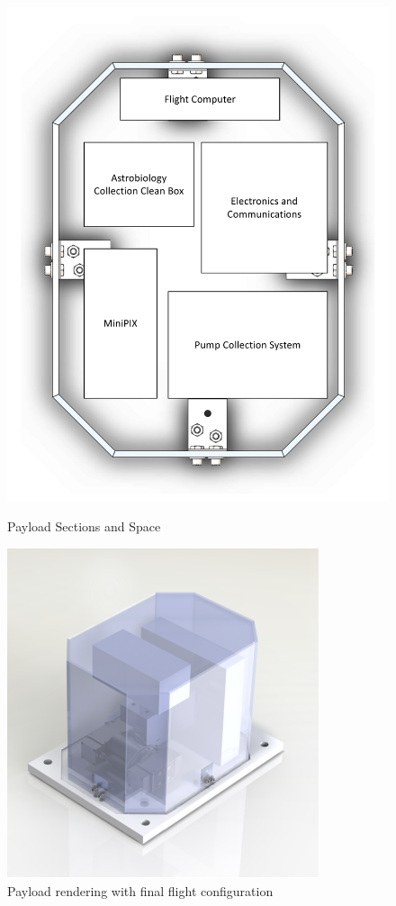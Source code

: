 \begin{figure}[H]
    \centering
    \begin{minipage}{0.45\textwidth}
        \centering
        \includegraphics[width=60 mm, scale=1]{figures/payload_sections.pdf} %
        \caption{Payload Sections and Space}
        	\label{fig:payload_sec}
    \end{minipage}\hfill
    \begin{minipage}{0.45\textwidth}
        \centering
        \includegraphics[width=78 mm, scale=1]{figures/Final_Render.pdf} %
        \caption{Payload rendering with final flight configuration}
        	\label{fig:final_render}
    \end{minipage}
\end{figure}
